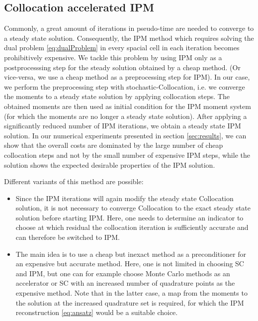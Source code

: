 \subsection{Collocation accelerated IPM}
\label{sec:collIPM}
Commonly, a great amount of iterations in pseudo-time are needed to converge to a steady state solution. Consequently, the IPM method which requires solving the dual problem \eqref{eq:dualProblem} in every spacial cell in each iteration becomes prohibitively expensive. We tackle this problem by using IPM only as a postprocesssing step for the steady solution obtained by a cheap method. (Or vice-versa, we use a cheap method as a preprocessing step for IPM). In our case, we perform the preprocessing step with stochastic-Collocation, i.e. we converge the moments to a steady state solution by applying collocation steps. The obtained moments are then used as initial condition for the IPM moment system (for which the moments are no longer a steady state solution). After applying a significantly reduced number of IPM iterations, we obtain a steady state IPM solution. In our numerical experiments presented in section \ref{sec:results}, we can show that the overall costs are dominated by the large number of cheap collocation steps and not by the small number of expensive IPM steps, while the solution shows the expected desirable properties of the IPM solution.

Different variants of this method are possible:
\begin{itemize}
\item Since the IPM iterations will again modify the steady state Collocation solution, it is not necessary to converge Collocation to the exact steady state solution before starting IPM. Here, one needs to determine an indicator to choose at which residual the collocation iteration is sufficiently accurate and can therefore be switched to IPM.
\item The main idea is to use a cheap but inexact method as a preconditioner for an expensive but accurate method. Here, one is not limited in choosing SC and IPM, but one can for example choose Monte Carlo methods as an accelerator or SC with an increased number of quadrature points as the expensive method. Note that in the latter case, a map from the moments to the solution at the increased quadrature set is required, for which the IPM reconstruction \eqref{eq:ansatz} would be a suitable choice.
\end{itemize}